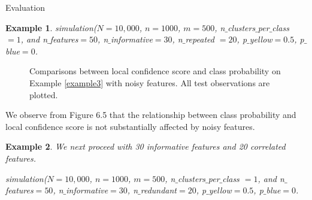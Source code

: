 \documentclass[12pt]{pom_thesis}
\newtheorem{example}{Example}[section]
\begin{document}
\begin{chapter}{Evaluation}
\begin{example}
simulation($N=10,000$, $n=1000$, $m=500$, n$\_$clusters$\_$per$\_$class $= 1$, and n$\_$features$=50$, n$\_$informative$=30$, n$\_$repeated $=20$, p$\_$yellow$=0.5$, p$\_$blue$=0$.
\end{example}

\begin{figure}[h]
\centering
{}
\label{fig3}
\caption{Comparisons between local confidence score and class probability on Example \ref{example3} with noisy features. All test observations are plotted.}
\end{figure}

We observe from Figure 6.5 that the relationship between class probability and local confidence score is not substantially affected by noisy features.

\vspace{3mm}

\begin{example}
\label{example4}
We next proceed with 30 informative features and 20 correlated features.

simulation($N=10,000$, $n=1000$, $m=500$, n$\_$clusters$\_$per$\_$class $= 1$, and n$\_$features$=50$, n$\_$informative$=30$, n$\_$redundant$=20$, p$\_$yellow$=0.5$, p$\_$blue$=0$.
\end{example}


\end{chapter}
\end{document}
